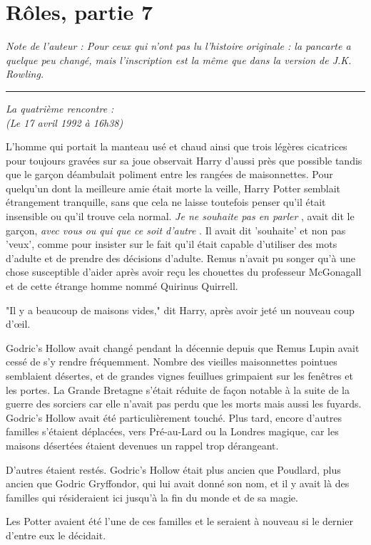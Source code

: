 
\chapter{Rôles, partie 7}

\emph{Note de l'auteur : Pour ceux qui n'ont pas lu l'histoire originale : la pancarte a quelque peu changé, mais l'inscription est la même que dans la version de J.K. Rowling.} 
\par\noindent\rule{\textwidth}{0.4pt}
\emph{La quatrième rencontre :} \\\emph{(Le 17 avril 1992 à 16h38)} 

L'homme qui portait la manteau usé et chaud ainsi que trois légères cicatrices pour toujours gravées sur sa joue observait Harry d'aussi près que possible tandis que le garçon déambulait poliment entre les rangées de maisonnettes. Pour quelqu'un dont la meilleure amie était morte la veille, Harry Potter semblait étrangement tranquille, sans que cela ne laisse toutefois penser qu'il était insensible ou qu'il trouve cela normal. \emph{Je ne souhaite pas en parler} , avait dit le garçon, \emph{avec vous ou qui que ce soit d'autre} . Il avait dit 'souhaite' et non pas 'veux', comme pour insister sur le fait qu'il était capable d'utiliser des mots d'adulte et de prendre des décisions d'adulte. Remus n'avait pu songer qu'à une chose susceptible d'aider après avoir reçu les chouettes du professeur McGonagall et de cette étrange homme nommé Quirinus Quirrell.

"Il y a beaucoup de maisons vides," dit Harry, après avoir jeté un nouveau coup d'œil.

Godric's Hollow avait changé pendant la décennie depuis que Remus Lupin avait cessé de s'y rendre fréquemment. Nombre des vieilles maisonnettes pointues semblaient désertes, et de grandes vignes feuillues grimpaient sur les fenêtres et les portes. La Grande Bretagne s'était réduite de façon notable à la suite de la guerre des sorciers car elle n'avait pas perdu que les morts mais aussi les fuyards. Godric's Hollow avait été particulièrement touché. Plus tard, encore d'autres familles s'étaient déplacées, vers Pré-au-Lard ou la Londres magique, car les maisons désertées étaient devenues un rappel trop dérangeant.

D'autres étaient restés. Godric's Hollow était plus ancien que Poudlard, plus ancien que Godric Gryffondor, qui lui avait donné son nom, et il y avait là des familles qui résideraient ici jusqu'à la fin du monde et de sa magie.

Les Potter avaient été l'une de ces familles et le seraient à nouveau si le dernier d'entre eux le décidait.

